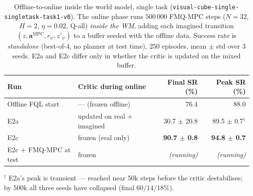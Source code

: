 \begin{table}[h]
\centering
\caption{Offline-to-online inside the world model, single task
   (\texttt{visual-cube-single-singletask-task1-v0}). The online phase runs $500\,000$
   FMQ-MPC steps ($N = 32$, $H = 2$, $\eta = 0.02$, Q-all) \emph{inside the WM}, adding each
   imagined transition $(z, \mathbf{a}^{\text{MPC}}, r_\psi, z'_\psi)$ to a buffer seeded with the
   offline data. Success rate is \emph{standalone} (best-of-$4$, no planner at test time), $250$
   episodes, mean $\pm$ std over $3$ seeds. E2a and E2c differ only in whether the critic is updated
   on the mixed buffer.}
\label{tab:mpc-online-e2}
\begin{tabular}{l l r r}
\toprule
Run & Critic during online & Final SR (\%) & Peak SR (\%) \\
\midrule
Offline FQL start          & --- (frozen offline)         & 76.4 & 88.0 \\
E2a                        & updated on real $+$ imagined & 30.7 $\pm$ 20.8 & 89.5 $\pm$ 0.7$^{\dagger}$ \\
E2c                        & frozen (real only)           & \textbf{90.7 $\pm$ 0.8} & \textbf{94.8 $\pm$ 0.7} \\
\midrule
E2c $+$ FMQ-MPC at test    & frozen                       & \textit{(running)} & \textit{(running)} \\
\bottomrule
\end{tabular}

\vspace{2pt}
{\footnotesize $^{\dagger}$ E2a's peak is transient --- reached near $50$k steps before the critic destabilises; by $500$k all three seeds have collapsed (final $60/14/18\%$).}
\end{table}

